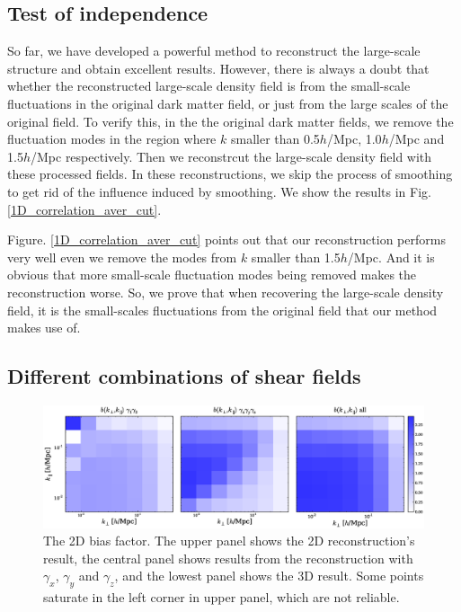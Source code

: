 \documentclass[aps,prd,twocolumn,showpacs,superscriptaddress,groupedaddress,nofootinbib]{revtex4}  %
\begin{document}
\subsection{Test of independence}
So far, we have developed a powerful method to reconstruct the large-scale structure and obtain excellent results. However, there is always a doubt that whether the reconstructed large-scale density field is from the small-scale fluctuations in the original dark matter field, or just from the large scales of the original field. To verify this, in the the original dark matter fields, we remove the fluctuation modes in the region where $k$ smaller than 0.5$h$/Mpc, 1.0$h$/Mpc and 1.5$h$/Mpc respectively. Then we reconstrcut the large-scale density field with these processed fields. In these reconstructions, we skip the process of smoothing to get rid of the influence induced by smoothing. We show the results in Fig. \ref{1D_correlation_aver_cut}.

Figure. \ref{1D_correlation_aver_cut} points out that our reconstruction performs very well even we remove the modes from $k$ smaller than 1.5$h$/Mpc. And it is obvious that more small-scale fluctuation modes being removed makes the reconstruction worse. So, we prove that when recovering the large-scale density field, it is the small-scales fluctuations from the original field that our method makes use of.

\subsection{Different combinations of shear fields}

\begin{figure}[!htp]
     \centering
     \includegraphics[width=18cm]{bias_subfigure.eps}
     \caption{The 2D bias factor. The upper panel shows the 2D reconstruction's result, the central panel shows results from the reconstruction with $\gamma_{x}$, $\gamma_{y}$ and $\gamma_{z}$, and the lowest panel shows the 3D result. Some points saturate in the left corner in upper panel, which are not reliable.}
     \label{2Dbias}
\end{figure}
\end{document}

